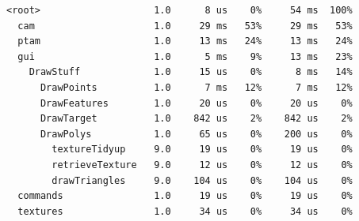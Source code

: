 \documentclass[a4paper,10pt]{article}
\begin{document}
\begin{enumerate}
{\begin{verbatim}
<root>                    1.0      8 us    0%     54 ms  100%
  cam                     1.0     29 ms   53%     29 ms   53%
  ptam                    1.0     13 ms   24%     13 ms   24%
  gui                     1.0      5 ms    9%     13 ms   23%
    DrawStuff             1.0     15 us    0%      8 ms   14%
      DrawPoints          1.0      7 ms   12%      7 ms   12%
      DrawFeatures        1.0     20 us    0%     20 us    0%
      DrawTarget          1.0    842 us    2%    842 us    2%
      DrawPolys           1.0     65 us    0%    200 us    0%
        textureTidyup     9.0     19 us    0%     19 us    0%
        retrieveTexture   9.0     12 us    0%     12 us    0%
        drawTriangles     9.0    104 us    0%    104 us    0%
  commands                1.0     19 us    0%     19 us    0%
  textures                1.0     34 us    0%     34 us    0%
\end{verbatim}
}
\end{enumerate}
\end{document}
